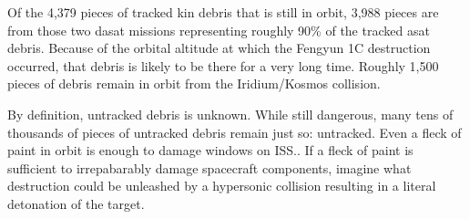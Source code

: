 Of the 4,379 pieces of tracked \ac{kin} debris that is still in orbit,
3,988 pieces are from those two \ac{dasat} missions representing
roughly 90\% of the tracked \ac{asat} debris.\cite[Table 5-1,
  p05-01]{brian} Because of the orbital altitude at which the Fengyun
1C destruction occurred, that debris is likely to be there for a very
long time.\cite{osa-debris} Roughly 1,500 pieces of debris remain
in orbit from the Iridium/Kosmos collision.

By definition, untracked debris is unknown.  While still dangerous,
many tens of thousands of pieces of untracked debris remain just so:
untracked.\cite[p05-01]{brian} Even a fleck of paint in orbit is
enough to damage windows on ISS.\cite{paint-is-power}.  If a fleck of
paint is sufficient to irrepabarably damage spacecraft components,
imagine what destruction could be unleashed by a hypersonic collision
resulting in a literal detonation of the
target.\cite[p8]{kessler-reunion}
